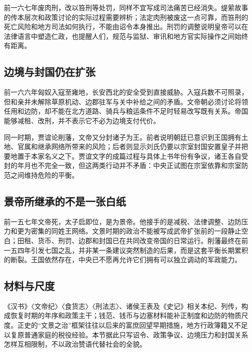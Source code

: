 前一六七年废肉刑，改以笞刑等处罚，同样不宜写成司法痛苦已经消失。缇萦故事的传本层次和政策讨论的实际过程需要辨析；法定肉刑被废这一点可靠，而笞刑的死亡风险和地方司法如何执行，不能由诏令本身推出。刑罚的调整说明皇帝可以在法律语言中塑造仁政，也提醒人们，规范与监狱、审讯和地方官实际操作之间始终有距离。

\subsection{边境与封国仍在扩张}

前一六六年匈奴入寇至雍地，长安西北的安全受到直接威胁。入寇兵数不可照录，但和亲并未解除草原机动、边郡驻军与关中补给之间的矛盾。文帝朝必须讨论将领任用和边防，却不能在北方道路、骑兵与粮运条件不足时轻易改写既有关系。帝国能够减租、改刑，并不表示它不必为边境支付代价。

同一时期，贾谊论削藩，文帝又分封诸子为王。前者说明朝廷已意识到王国拥有土地、官属和继承网络所带来的风险；后者则显示刘氏仍要以宗室封国安置皇子并把要地置于本家名义之下。贾谊文字的成篇过程与具体上书年份有争议，诸王各自受封的年月也不完全一致，但这两类行动并不矛盾：中央正试图在宗室依靠和宗室防范之间维持危险的平衡。

\subsection{景帝所继承的不是一张白纸}

前一五七年文帝死，太子启即位，是为景帝。他接手的是减税、法律调整、边防压力和更为密集的同姓王网络。文景时期的政治不能被写成武帝扩张前的一段静止空白；田租、货币、刑罚、边郡和封国已在共同改变帝国的日常运行。削藩最终在前一五四年引发七国之乱，并非某一条建议突然制造的后果，而是这套平衡长期累积的断裂。王国依然存在，中央已不愿再允许它们拥有可以独立调动的军政能力。

\subsection{材料与尺度}

《汉书》〈文帝纪〉〈食货志〉〈刑法志〉、诸侯王表及《史记》相关本纪、列传，构成恢复时期的年序和政策主干；钱范、钱币与边塞材料能补正制度和边防的物质尺度。正史的“文景之治”框架往往以后来的富庶回望早期措施，地方行政簿籍又不足以复原普通家庭的税役经验。本节据此只写诏令、政策争议、边境压力和封国关系怎样互相限制，不以政治赞语代替社会的全貌。
